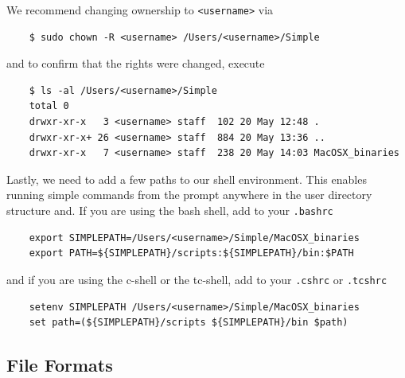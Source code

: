 \documentclass[a4paper,11pt]{article}
\begin{document}
We recommend changing ownership to \texttt{<username>} via   
\begin{verbatim}
    $ sudo chown -R <username> /Users/<username>/Simple
\end{verbatim}
and to confirm that the rights were changed, execute
\begin{verbatim}
    $ ls -al /Users/<username>/Simple
    total 0
    drwxr-xr-x   3 <username> staff  102 20 May 12:48 .
    drwxr-xr-x+ 26 <username> staff  884 20 May 13:36 ..
    drwxr-xr-x   7 <username> staff  238 20 May 14:03 MacOSX_binaries
\end{verbatim}
Lastly, we need to add a few paths to our shell environment. This enables running simple commands from the prompt anywhere in the user directory structure and. If you are using the bash shell, add to your \texttt{.bashrc}
\begin{verbatim}
    export SIMPLEPATH=/Users/<username>/Simple/MacOSX_binaries
    export PATH=${SIMPLEPATH}/scripts:${SIMPLEPATH}/bin:$PATH
\end{verbatim}
and if you are using the c-shell or the tc-shell, add to your \texttt{.cshrc} or \texttt{.tcshrc}
\begin{verbatim}
    setenv SIMPLEPATH /Users/<username>/Simple/MacOSX_binaries
    set path=(${SIMPLEPATH}/scripts ${SIMPLEPATH}/bin $path)
\end{verbatim}

\subsection{File Formats}
\end{document}
